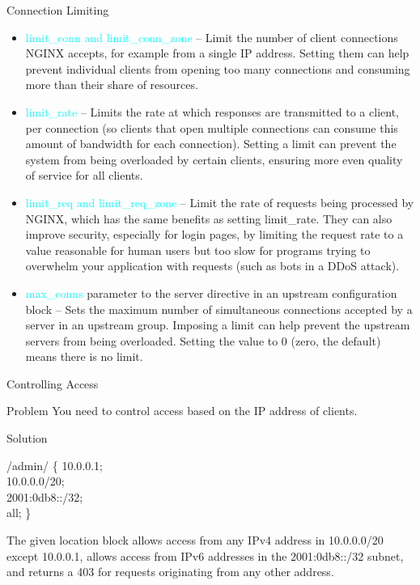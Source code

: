 \documentclass{beamer}
\begin{document}
\begin{frame}{Connection Limiting}
\scriptsize

\begin{itemize}
	\item \textcolor{cyan}{limit\_conn and limit\_conn\_zone} – Limit the number of client connections NGINX accepts, for example from a single IP address. Setting them can help prevent individual clients from opening too many connections and consuming more than their share of resources.
	\item \textcolor{cyan}{limit\_rate} – Limits the rate at which responses are transmitted to a client, per connection (so clients that open multiple connections can consume this amount of bandwidth for each connection). Setting a limit can prevent the system from being overloaded by certain clients, ensuring more even quality of service for all clients.
	\item \textcolor{cyan}{limit\_req and limit\_req\_zone} – Limit the rate of requests being processed by NGINX, which has the same benefits as setting limit\_rate. They can also improve security, especially for login pages, by limiting the request rate to a value reasonable for human users but too slow for programs trying to overwhelm your application with requests (such as bots in a DDoS attack).
	\item \textcolor{cyan}{max\_conns}  parameter to the server directive in an upstream configuration block – Sets the maximum number of simultaneous connections accepted by a server in an upstream group. Imposing a limit can help prevent the upstream servers from being overloaded. Setting the value to 0 (zero, the default) means there is no limit.
\end{itemize}
\end{frame}


\begin{frame}{Controlling Access}

\scriptsize
\begin{block}{Problem}
\vspace{0.01\textheight}
You need to control access based on the IP address of clients.
\end{block}

\begin{block}{Solution}
\vspace{0.01\textheight}
\scriptsize
\begin{Alms*}
	 /admin/ \{ \NI
		 10.0.0.1; \\
		 10.0.0.0/20; \\
		 2001:0db8::/32; \\
		 all;
	\ND \}
\end{Alms*}
\end{block}

The given location block allows access from any IPv4 address in 10.0.0.0/20 except 10.0.0.1, allows access from IPv6 addresses in the 2001:0db8::/32 subnet, and returns a 403 for requests originating from any other address.

\end{frame}
\end{document}
